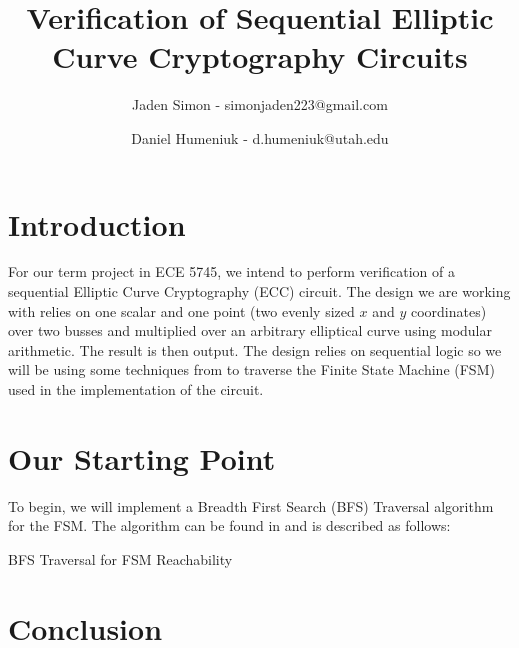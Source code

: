 \documentclass[12pt]{report}
\title{Verification of Sequential Elliptic Curve Cryptography Circuits}
\author{Jaden Simon - simonjaden223@gmail.com \\ \and
	   Daniel Humeniuk - d.humeniuk@utah.edu}
\begin{document}
\maketitle

\section{Introduction}

For our term project in ECE 5745, we intend to perform verification of a sequential Elliptic Curve Cryptography (ECC) circuit. The design we are working with relies on  one scalar and one point (two evenly sized $x$ and $y$ coordinates) over two busses and multiplied over an arbitrary elliptical curve using modular arithmetic. The result is then output. The design relies on sequential logic so we will be using some techniques from \cite{Kalla} to traverse the Finite State Machine (FSM) used in the implementation of the circuit.

\section{Our Starting Point}

To begin, we will implement a Breadth First Search (BFS) Traversal algorithm for the FSM. The algorithm can be found in \cite{Kalla} and is described as follows:

\begin{algorithm}
\caption{BFS Traversal for FSM Reachability}

\end{algorithm}

\section{Conclusion}




\end{document}
